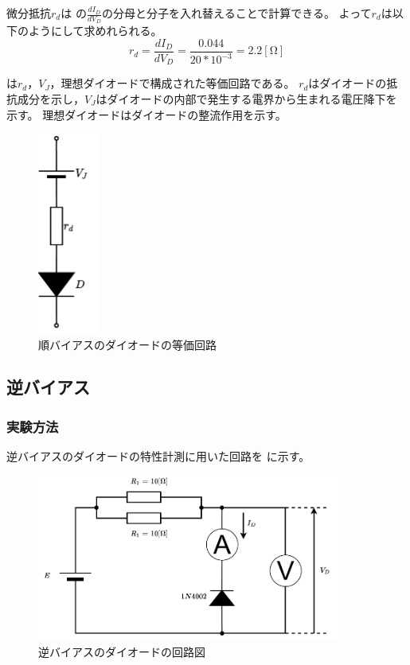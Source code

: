   微分抵抗$r_d$は の$\frac{dI_D}{dV_D}$の分母と分子を入れ替えることで計算できる。
  よって$r_d$は以下のようにして求めれられる。
  \begin{equation}
    r_d = \frac{dI_D}{dV_D} = \frac{0.044}{20*10^{-3}} = 2.2 \mathrm{[\Omega]} \nonumber
  \end{equation}
  
   は$r_d$，$V_J$，理想ダイオードで構成された等価回路である。
  $r_d$はダイオードの抵抗成分を示し，$V_J$はダイオードの内部で発生する電界から生まれる電圧降下を示す。
  理想ダイオードはダイオードの整流作用を示す。
  \begin{figure}[!h]
    \centering
    \includegraphics[width=2cm]{./pdfs/risou1.pdf}
    \caption{順バイアスのダイオードの等価回路}
    \label{fig:risou1}
  \end{figure}

\subsection{逆バイアス}
\subsubsection{実験方法}
  逆バイアスのダイオードの特性計測に用いた回路を に示す。

  \begin{figure}[!h]
    \centering
    \includegraphics[width=10cm]{./pdfs/diode2.pdf}
    \caption{逆バイアスのダイオードの回路図}
    \label{fig:diode2_circuit}
  \end{figure}

